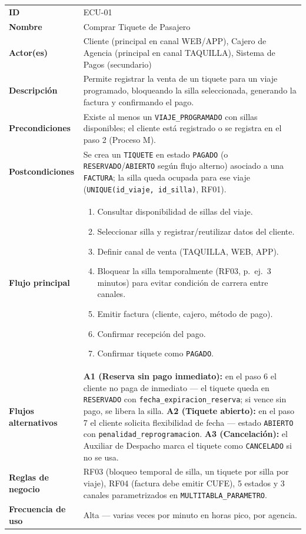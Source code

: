 \documentclass[11pt,a4paper]{article}
\begin{document}
{
\begin{longtable}{L{3.2cm} L{11.3cm}}
\toprule
\textbf{ID} & ECU-01 \\
\textbf{Nombre} & Comprar Tiquete de Pasajero \\
\textbf{Actor(es)} & Cliente (principal en canal WEB/APP), Cajero de Agencia (principal en canal TAQUILLA), Sistema de Pagos (secundario) \\
\textbf{Descripción} & Permite registrar la venta de un tiquete para un viaje programado, bloqueando la silla seleccionada, generando la factura y confirmando el pago. \\
\textbf{Precondiciones} & Existe al menos un \texttt{VIAJE_PROGRAMADO} con sillas disponibles; el cliente está registrado o se registra en el paso 2 (Proceso M). \\
\textbf{Postcondiciones} & Se crea un \texttt{TIQUETE} en estado \texttt{PAGADO} (o \texttt{RESERVADO}/\texttt{ABIERTO} según flujo alterno) asociado a una \texttt{FACTURA}; la silla queda ocupada para ese viaje (\texttt{UNIQUE(id_viaje, id_silla)}, RF01). \\
\textbf{Flujo principal} &
\begin{enumerate}[nosep,leftmargin=*]
  \item Consultar disponibilidad de sillas del viaje.
  \item Seleccionar silla y registrar/reutilizar datos del cliente.
  \item Definir canal de venta (TAQUILLA, WEB, APP).
  \item Bloquear la silla temporalmente (RF03, p.\ ej.\ 3 minutos) para evitar condición de carrera entre canales.
  \item Emitir factura (cliente, cajero, método de pago).
  \item Confirmar recepción del pago.
  \item Confirmar tiquete como \texttt{PAGADO}.
\end{enumerate} \\
\textbf{Flujos alternativos} &
\textbf{A1 (Reserva sin pago inmediato):} en el paso 6 el cliente no paga de inmediato --- el tiquete queda en \texttt{RESERVADO} con \texttt{fecha_expiracion_reserva}; si vence sin pago, se libera la silla.\newline
\textbf{A2 (Tiquete abierto):} en el paso 7 el cliente solicita flexibilidad de fecha --- estado \texttt{ABIERTO} con \texttt{penalidad_reprogramacion}.\newline
\textbf{A3 (Cancelación):} el Auxiliar de Despacho marca el tiquete como \texttt{CANCELADO} si no se usa. \\
\textbf{Reglas de negocio} & RF03 (bloqueo temporal de silla, un tiquete por silla por viaje), RF04 (factura debe emitir CUFE), 5 estados y 3 canales parametrizados en \texttt{MULTITABLA_PARAMETRO}. \\
\textbf{Frecuencia de uso} & Alta --- varias veces por minuto en horas pico, por agencia. \\
\bottomrule
\end{longtable}
}
\end{document}
